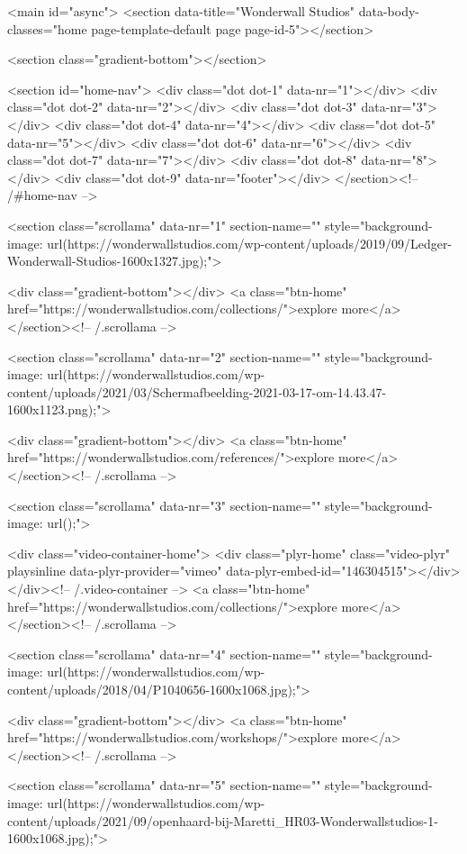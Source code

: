   <main id="async">
    <section data-title="Wonderwall Studios" data-body-classes="home page-template-default page page-id-5"></section>

<section class="gradient-bottom"></section>

<section id="home-nav">
    <div class="dot dot-1" data-nr="1"></div>
    <div class="dot dot-2" data-nr="2"></div>
    <div class="dot dot-3" data-nr="3"></div>
    <div class="dot dot-4" data-nr="4"></div>
    <div class="dot dot-5" data-nr="5"></div>
    <div class="dot dot-6" data-nr="6"></div>
    <div class="dot dot-7" data-nr="7"></div>
    <div class="dot dot-8" data-nr="8"></div>
    <div class="dot dot-9" data-nr="footer"></div>
</section><!-- /#home-nav -->


<section class="scrollama" data-nr="1" section-name="" style="background-image: url(https://wonderwallstudios.com/wp-content/uploads/2019/09/Ledger-Wonderwall-Studios-1600x1327.jpg);">

    <div class="gradient-bottom"></div>
    <a class="btn-home" href="https://wonderwallstudios.com/collections/">explore more</a>
</section><!-- /.scrollama -->


<section class="scrollama" data-nr="2" section-name="" style="background-image: url(https://wonderwallstudios.com/wp-content/uploads/2021/03/Schermafbeelding-2021-03-17-om-14.43.47-1600x1123.png);">

    <div class="gradient-bottom"></div>
    <a class="btn-home" href="https://wonderwallstudios.com/references/">explore more</a>
</section><!-- /.scrollama -->


<section class="scrollama" data-nr="3" section-name="" style="background-image: url();">

    <div class="video-container-home">
     <div class="plyr-home" class="video-plyr" playsinline data-plyr-provider="vimeo" data-plyr-embed-id="146304515"></div>
  </div><!-- /.video-container -->
    <a class="btn-home" href="https://wonderwallstudios.com/collections/">explore more</a>
</section><!-- /.scrollama -->


<section class="scrollama" data-nr="4" section-name="" style="background-image: url(https://wonderwallstudios.com/wp-content/uploads/2018/04/P1040656-1600x1068.jpg);">

    <div class="gradient-bottom"></div>
    <a class="btn-home" href="https://wonderwallstudios.com/workshops/">explore more</a>
</section><!-- /.scrollama -->


<section class="scrollama" data-nr="5" section-name="" style="background-image: url(https://wonderwallstudios.com/wp-content/uploads/2021/09/openhaard-bij-Maretti_HR03-Wonderwallstudios-1-1600x1068.jpg);">

